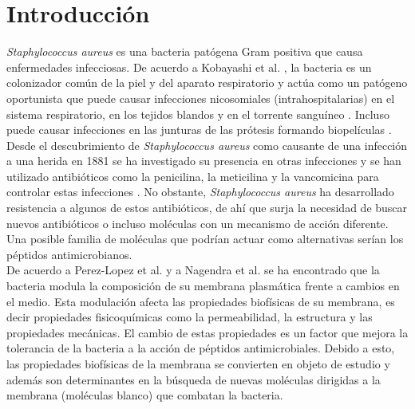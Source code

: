 \chapter{Introducci\'{o}n}
\textit{Staphylococcus aureus} es una bacteria pat\'{o}gena Gram positiva que causa enfermedades infecciosas. De acuerdo a Kobayashi et al. \cite{Kobayashi2015PathogenesisAbscesses}, la bacteria es un colonizador com\'{u}n de la piel y del aparato respiratorio y act\'{u}a como un pat\'{o}geno oportunista que puede causar infecciones nicosomiales (intrahospitalarias) en el sistema respiratorio, en los tejidos blandos y en el torrente sangu\'ineo \cite{HarpavatS.NissimS.LipppincottsMicrocards:MicrobiologyFlashCards2012.}. Incluso puede causar infecciones en las junturas de las pr\'otesis formando biopel\'iculas \cite{Meylan2018}.\\



Desde el descubrimiento de \textit{Staphylococcus aureus} como causante de una infecci\'on a una herida en 1881 \cite{Orent2006AMagazine} se ha investigado su presencia en otras infecciones y se han utilizado antibi\'oticos como la penicilina, la meticilina y la vancomicina para controlar estas infecciones   \cite{HarpavatS.NissimS.LipppincottsMicrocards:MicrobiologyFlashCards2012.}. No obstante, \textit{Staphylococcus aureus} ha desarrollado resistencia a algunos de estos antibi\'oticos,  de ah\'{i} que surja la necesidad de buscar nuevos antibi\'oticos o incluso mol\'{e}culas con un mecanismo de acci\'{o}n diferente. Una posible familia de mol\'{e}culas que podr\'{i}an actuar como alternativas ser\'{i}an los p\'{e}ptidos antimicrobianos.\\

De acuerdo a Perez-Lopez et al. \cite{Perez-LopezVariationsProperties} y a Nagendra et al.  \cite{Nagendra2011} se ha encontrado que la bacteria modula la composici\'{o}n de su membrana plasm\'{a}tica frente a cambios en el medio. Esta modulaci\'{o}n afecta las propiedades biof\'{i}sicas de su membrana, es decir propiedades fisicoqu\'{i}micas como la permeabilidad, la estructura y las propiedades mec\'{a}nicas. El cambio de estas propiedades es un factor que mejora la tolerancia de la bacteria a la acci\'{o}n de p\'{e}ptidos antimicrobiales. Debido a esto, las propiedades biof\'{i}sicas de la membrana se convierten en objeto de estudio y adem\'{a}s son determinantes en la b\'{u}squeda de nuevas mol\'{e}culas dirigidas a la membrana (mol\'{e}culas blanco) que combatan la bacteria. \\

